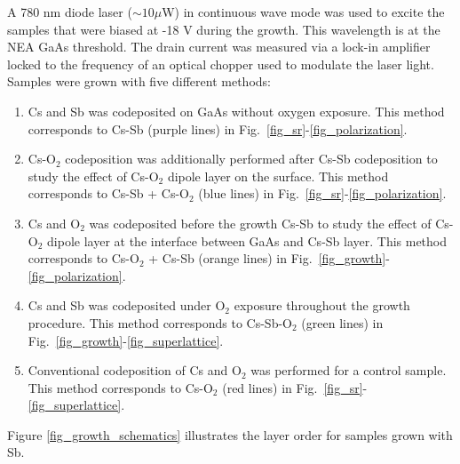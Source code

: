 A 780 nm diode laser ($\sim 10 \mu$W) in continuous wave mode was used to excite the samples\cite{feng2019_activation} that were biased at -18 V during the growth. This wavelength is at the NEA GaAs threshold. The drain current was measured via a lock-in amplifier locked to the frequency of an optical chopper used to modulate the laser light.
Samples were grown with five different methods:
\begin{enumerate}[label=(\alph*)]
	\item Cs and Sb was codeposited on GaAs without oxygen exposure. This method corresponds to Cs-Sb (purple lines) in Fig.~\ref{fig_sr}-\ref{fig_polarization}.
	\item Cs-O$_2$ codeposition was additionally performed after Cs-Sb codeposition to study the effect of Cs-O$_2$ dipole layer on the surface. This method corresponds to Cs-Sb + Cs-O$_2$ (blue lines) in Fig.~\ref{fig_sr}-\ref{fig_polarization}.
	\item Cs and O$_2$ was codeposited before the growth Cs-Sb to study the effect of Cs-O$_2$ dipole layer at the interface between GaAs and Cs-Sb layer. This method corresponds to Cs-O$_2$ + Cs-Sb (orange lines) in Fig.~\ref{fig_growth}-\ref{fig_polarization}.
	\item Cs and Sb was codeposited under O$_2$ exposure throughout the growth procedure. This method corresponds to Cs-Sb-O$_2$ (green lines) in Fig.~\ref{fig_growth}-\ref{fig_superlattice}.
	\item Conventional codeposition of Cs and O$_2$ was performed for a control sample. This method corresponds to Cs-O$_2$ (red lines) in Fig.~\ref{fig_sr}-\ref{fig_superlattice}.
\end{enumerate}
Figure \ref{fig_growth_schematics} illustrates the layer order for samples grown with Sb.

